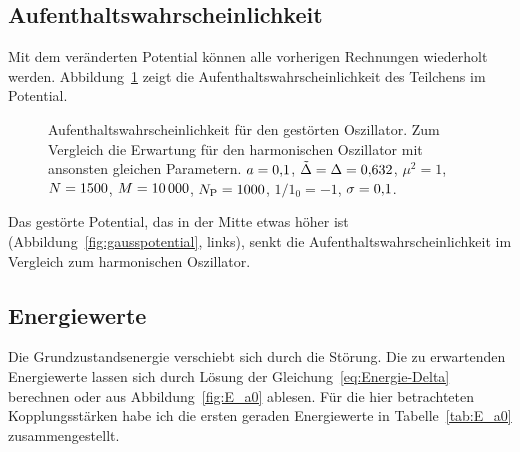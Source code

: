 \subsection{Aufenthaltswahrscheinlichkeit}

Mit dem veränderten Potential können alle vorherigen Rechnungen wiederholt
werden. Abbildung~\ref{fig:histogram_gauss} zeigt die
Aufenthaltswahrscheinlichkeit des Teilchens im Potential.

\begin{figure}[htbp]
    \centering
    \caption{%
        Aufenthaltswahrscheinlichkeit für den gestörten Oszillator. Zum
        Vergleich die Erwartung für den harmonischen Oszillator mit ansonsten
        gleichen Parametern. $a = \num{0.1}$, $\tilde \Delta =
        \Delta = \num{0.632}$, $\mu^2 = \num{1}$, $N = \num{1500}$,
        $M = \num{10000}$, $N_\text P = \num{1000}$, $1/1_0 =
        \num{-1}$, $\sigma = \num{0.1}$.
    }
    \label{fig:histogram_gauss}
\end{figure}

Das gestörte Potential, das in der Mitte etwas höher ist
(Abbildung~\ref{fig:gausspotential}, links), senkt die
Aufenthaltswahrscheinlichkeit im Vergleich zum harmonischen Oszillator.

\subsection{Energiewerte}

Die Grundzustandsenergie verschiebt sich durch die Störung. Die zu erwartenden
Energiewerte lassen sich durch Lösung der Gleichung~\eqref{eq:Energie-Delta}
berechnen oder aus Abbildung~\ref{fig:E_a0} ablesen. Für die hier betrachteten
Kopplungsstärken habe ich die ersten geraden Energiewerte in
Tabelle~\ref{tab:E_a0} zusammengestellt.

